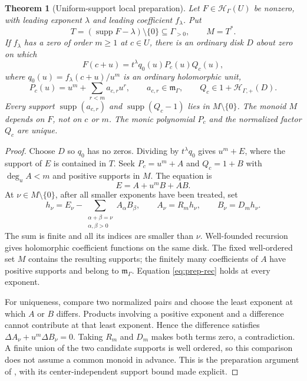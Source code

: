 \documentclass[11pt,letterpaper]{article}
\newtheorem{theorem}{Theorem}[section]
\theoremstyle{definition}
\theoremstyle{remark}
\newcommand{\HH}{\mathscr H_\Gamma}
\newcommand{\HP}{\mathscr H_{\Gamma,+}}
\newcommand{\mm}{\mathfrak m_\Gamma}
\newcommand{\supp}{\operatorname{supp}}
\numberwithin{equation}{section}
\begin{document}
\begin{theorem}[Uniform-support local preparation]\label{thm:preparation}
Let $F\in\HH(U)$ be nonzero, with leading exponent $\lambda$ and leading coefficient $f_\lambda$. Put
\[
 T=(\supp F-\lambda)\setminus\{0\}\subseteq\Gamma_{>0},
 \qquad M=T^*.
\]
If $f_\lambda$ has a zero of order $m\ge1$ at $c\in U$, there is an ordinary disk $D$ about zero on which
\begin{equation}\label{eq:prep}
 F(c+u)=t^\lambda q_0(u)P_c(u)Q_c(u),
\end{equation}
where $q_0(u)=f_\lambda(c+u)/u^m$ is an ordinary holomorphic unit,
\[
 P_c(u)=u^m+\sum_{r<m}a_{c,r}u^r,
 \qquad a_{c,r}\in\mm,
 \qquad Q_c\in1+\HP(D).
\]
Every support $\supp(a_{c,r})$ and $\supp(Q_c-1)$ lies in $M\setminus\{0\}$. The monoid $M$ depends on $F$, not on $c$ or $m$. The monic polynomial $P_c$ and the normalized factor $Q_c$ are unique.
\end{theorem}
\begin{proof}
Choose $D$ so $q_0$ has no zeros. Dividing by $t^\lambda q_0$ gives $u^m+E$, where the support of $E$ is contained in $T$. Seek $P_c=u^m+A$ and $Q_c=1+B$ with $\deg_u A<m$ and positive supports in $M$. The equation is
\begin{equation}\label{eq:prep-rec}
 E=A+u^m B+AB.
\end{equation}
At $\nu\in M\setminus\{0\}$, after all smaller exponents have been treated, set
\[
 h_\nu=E_\nu-
 \sum_{\substack{\alpha+\beta=\nu\\\alpha,\beta>0}}A_\alpha B_\beta,
 \qquad A_\nu=R_mh_\nu,\qquad B_\nu=D_mh_\nu.
\]
The sum is finite and all its indices are smaller than $\nu$. Well-founded recursion gives holomorphic coefficient functions on the same disk. The fixed well-ordered set $M$ contains the resulting supports; the finitely many coefficients of $A$ have positive supports and belong to $\mm$. Equation \eqref{eq:prep-rec} holds at every exponent.

For uniqueness, compare two normalized pairs and choose the least exponent at which $A$ or $B$ differs. Products involving a positive exponent and a difference cannot contribute at that least exponent. Hence the difference satisfies $\Delta A_\nu+u^m\Delta B_\nu=0$. Taking $R_m$ and $D_m$ makes both terms zero, a contradiction. A finite union of the two candidate supports is well ordered, so this comparison does not assume a common monoid in advance. This is the preparation argument of \cite[\S7]{Source}, with its center-independent support bound made explicit.
\end{proof}
\end{document}
